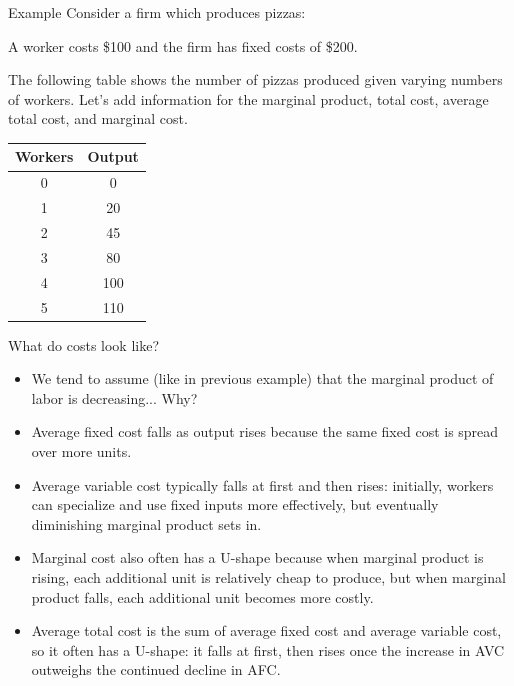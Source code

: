 \documentclass[compress]{beamer}
\begin{document}
\begin{frame}{Example}
    Consider a firm which produces pizzas:
    
    \vspace{3mm}
    
     A worker costs \$100 and the firm has fixed costs of \$200. 
     
     \vspace{3mm}
     
         The following table shows the number of pizzas produced given varying numbers of workers. Let's add information for the marginal product, total cost, average total cost, and marginal cost.
    \begin{table}[H]
        \centering
        \begin{tabular}{cc}
            Workers & Output \\
            \hline
            0 & 0 \\
            1 & 20 \\
            2 & 45 \\
            3 & 80 \\
            4 & 100 \\
            5 & 110 \\
        \end{tabular}

        \label{tab:placeholder}
    \end{table}
\end{frame}

\begin{frame}{What do costs look like?}
    \begin{itemize}
        \item We tend to assume (like in previous example) that the marginal product of labor is decreasing... Why?
        \item Average fixed cost falls as output rises because the same fixed cost is spread over more units.
        \item Average variable cost typically falls at first and then rises: initially, workers can specialize and use fixed inputs more effectively, but eventually diminishing marginal product sets in.
        \item Marginal cost also often has a U-shape because when marginal product is rising, each additional unit is relatively cheap to produce, but when marginal product falls, each additional unit becomes more costly.
        \item Average total cost is the sum of average fixed cost and average variable cost, so it often has a U-shape: it falls at first, then rises once the increase in AVC outweighs the continued decline in AFC.
    \end{itemize}

\end{frame}
\end{document}

